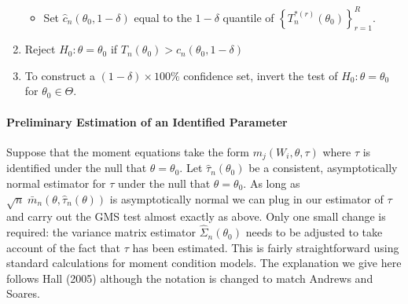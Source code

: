 \documentclass[12pt]{article}
\begin{document}
\begin{enumerate}
\begin{itemize}
      \item Set $\widehat{c}_n(\theta_0, 1 - \delta)$ equal to the $1 - \delta$ quantile of $\left\{ T_n^{*(r)}(\theta_0) \right\}_{r=1}^R$.
    \end{itemize}
  \item Reject $H_0\colon \theta = \theta_0$ if $T_n(\theta_0) > \widehat{c}_n(\theta_0, 1-\delta)$
  \item To construct a $(1 - \delta)\times 100\%$ confidence set, invert the test of $H_0\colon \theta = \theta_0$ for $\theta_0 \in \Theta$.
\end{enumerate}


\paragraph{Preliminary Estimation of an Identified Parameter}
Suppose that the moment equations take the form $m_j(W_i, \theta, \tau)$ where $\tau$ is identified under the null that $\theta = \theta_0$.
Let $\widehat{\tau}_n(\theta_0)$ be a consistent, asymptotically normal estimator for $\tau$ under the null that $\theta = \theta_0$.
As long as $\sqrt{n} \; \bar{m}_n(\theta, \widehat{\tau}_n(\theta))$ is asymptotically normal we can plug in our estimator of $\tau$ and carry out the GMS test almost exactly as above.
Only one small change is required: the variance matrix estimator $\widehat{\Sigma}_n(\theta_0)$ needs to be adjusted to take account of the fact that $\tau$ has been estimated.
This is fairly straightforward using standard calculations for moment condition models.
The explanation we give here follows Hall (2005) although the notation is changed to match Andrews and Soares.
\end{document}
